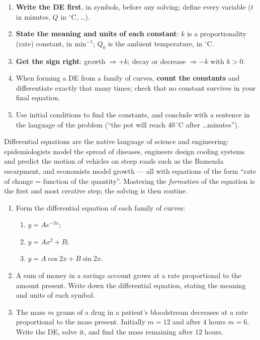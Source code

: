 \documentclass[11pt]{article}
\newcounter{popsec}
\newcounter{popsub}
\newcommand{\courssub}[1]{%
  \stepcounter{popsub}%
  \par\vspace{9pt}\noindent{\popxbold\fontsize{11.5}{13}\selectfont\color{popink}{\color{poporange}\thepopsec.\thepopsub}\hspace{6pt}#1}\par\nopagebreak\vspace{4pt}
}
\begin{document}
\courssub{Exam Technique}

\begin{aretenir}
\begin{enumerate}
\item \textbf{Write the DE first}, in symbols, before any solving; define every variable ($t$ in minutes, $Q$ in $^{\circ}\mathrm{C}$, \dots).
\item \textbf{State the meaning and units of each constant}: $k$ is a proportionality (rate) constant, in $\mathrm{min}^{-1}$; $Q_{0}$ is the ambient temperature, in $^{\circ}\mathrm{C}$.
\item \textbf{Get the sign right}: growth $\Rightarrow +k$; decay or decrease $\Rightarrow -k$ with $k>0$.
\item When forming a DE from a family of curves, \textbf{count the constants} and differentiate exactly that many times; check that no constant survives in your final equation.
\item Use initial conditions to find the constants, and conclude with a sentence in the language of the problem (``the pot will reach $40\,^{\circ}\mathrm{C}$ after \dots minutes'').
\end{enumerate}
\end{aretenir}

\begin{savaistu}
Differential equations are the native language of science and engineering: epidemiologists model the spread of diseases, engineers design cooling systems and predict the motion of vehicles on steep roads such as the Bamenda escarpment, and economists model growth --- all with equations of the form ``rate of change = function of the quantity''. Mastering the \emph{formation} of the equation is the first and most creative step; the solving is then routine.
\end{savaistu}

\begin{exercice}
\begin{enumerate}
\item Form the differential equation of each family of curves:
\begin{enumerate}
\item $y=Ae^{-3x}$;
\item $y=Ax^{2}+B$;
\item $y=A\cos 2x+B\sin 2x$.
\end{enumerate}
\item A sum of money in a savings account grows at a rate proportional to the amount present. Write down the differential equation, stating the meaning and units of each symbol.
\item The mass $m$ grams of a drug in a patient's bloodstream decreases at a rate proportional to the mass present. Initially $m=12$ and after $4$ hours $m=6$. Write the DE, solve it, and find the mass remaining after $12$ hours.
\end{enumerate}
\end{exercice}
\end{document}
